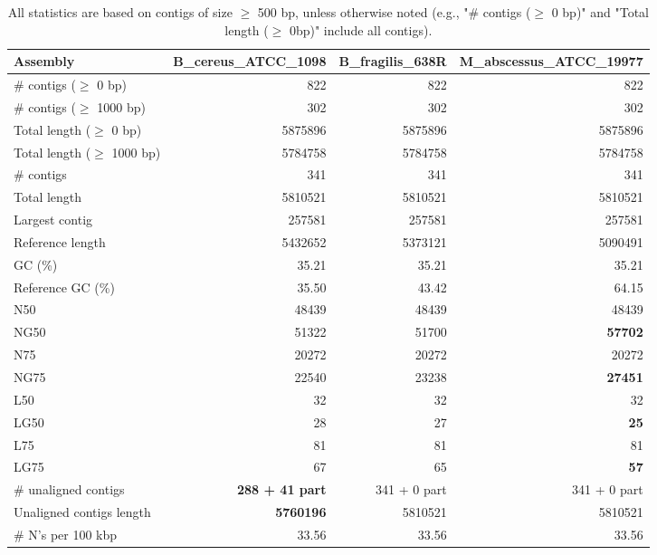\documentclass[12pt,a4paper]{article}
\begin{document}
\begin{table}[ht]
\begin{center}
\caption{All statistics are based on contigs of size $\geq$ 500 bp, unless otherwise noted (e.g., "\# contigs ($\geq$ 0 bp)" and "Total length ($\geq$ 0bp)" include all contigs).}
\begin{tabular}{|l*{3}{|r}|}
\hline
Assembly & B\_cereus\_ATCC\_1098 & B\_fragilis\_638R & M\_abscessus\_ATCC\_19977 \\ \hline
\# contigs ($\geq$ 0 bp) & 822 & 822 & 822 \\ \hline
\# contigs ($\geq$ 1000 bp) & 302 & 302 & 302 \\ \hline
Total length ($\geq$ 0 bp) & 5875896 & 5875896 & 5875896 \\ \hline
Total length ($\geq$ 1000 bp) & 5784758 & 5784758 & 5784758 \\ \hline
\# contigs & 341 & 341 & 341 \\ \hline
Total length & 5810521 & 5810521 & 5810521 \\ \hline
Largest contig & 257581 & 257581 & 257581 \\ \hline
Reference length & 5432652 & 5373121 & 5090491 \\ \hline
GC (\%) & 35.21 & 35.21 & 35.21 \\ \hline
Reference GC (\%) & 35.50 & 43.42 & 64.15 \\ \hline
N50 & 48439 & 48439 & 48439 \\ \hline
NG50 & 51322 & 51700 & {\bf 57702} \\ \hline
N75 & 20272 & 20272 & 20272 \\ \hline
NG75 & 22540 & 23238 & {\bf 27451} \\ \hline
L50 & 32 & 32 & 32 \\ \hline
LG50 & 28 & 27 & {\bf 25} \\ \hline
L75 & 81 & 81 & 81 \\ \hline
LG75 & 67 & 65 & {\bf 57} \\ \hline
\# unaligned contigs & {\bf 288 + 41 part} & 341 + 0 part & 341 + 0 part \\ \hline
Unaligned contigs length & {\bf 5760196} & 5810521 & 5810521 \\ \hline
\# N's per 100 kbp & 33.56 & 33.56 & 33.56 \\ \hline
\end{tabular}
\end{center}
\end{table}
\end{document}
